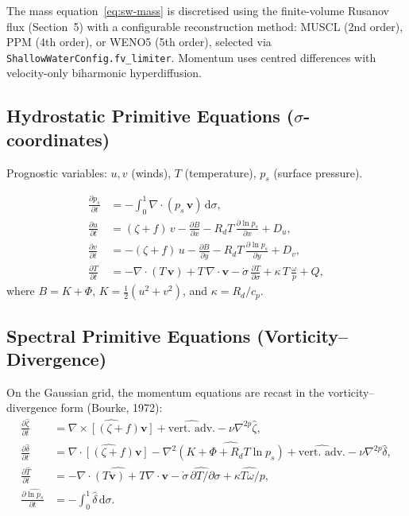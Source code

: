 \documentclass[11pt,a4paper]{article}
\newcommand{\dd}{\mathrm{d}}
\newcommand{\pp}{\partial}
\newcommand{\half}{\tfrac{1}{2}}
\newcommand{\Rd}{R_d}
\newcommand{\cpd}{c_p}
\begin{document}
The mass equation~\eqref{eq:sw-mass} is discretised using the finite-volume Rusanov flux (Section~5) with a configurable reconstruction method: MUSCL (2nd order), PPM (4th order), or WENO5 (5th order), selected via \texttt{ShallowWaterConfig.fv\_limiter}.  Momentum uses centred differences with velocity-only biharmonic hyperdiffusion.

\subsection{Hydrostatic Primitive Equations ($\sigma$-coordinates)}

Prognostic variables: $u,v$ (winds), $T$ (temperature), $p_s$ (surface pressure).

\begin{align}
  \frac{\pp p_s}{\pp t} &= -\int_0^1 \nabla\!\cdot\!(p_s\,\bm v)\,\dd\sigma, \label{eq:pe-ps}\\
  \frac{\pp u}{\pp t} &= (\zeta+f)\,v - \frac{\pp B}{\pp x} - \Rd T\,\frac{\pp\ln p_s}{\pp x} + D_u, \label{eq:pe-u}\\
  \frac{\pp v}{\pp t} &= -(\zeta+f)\,u - \frac{\pp B}{\pp y} - \Rd T\,\frac{\pp\ln p_s}{\pp y} + D_v, \label{eq:pe-v}\\
  \frac{\pp T}{\pp t} &= -\nabla\!\cdot\!(T\,\bm v)+T\,\nabla\!\cdot\!\bm v - \dot\sigma\,\frac{\pp T}{\pp\sigma} + \kappa\,T\,\frac{\omega}{p} + Q, \label{eq:pe-T}
\end{align}
where $B=K+\Phi$, $K=\half(u^2+v^2)$, and $\kappa=\Rd/\cpd$.

\subsection{Spectral Primitive Equations (Vorticity--Divergence)}

On the Gaussian grid, the momentum equations are recast in the vorticity--divergence form (Bourke, 1972):
\begin{align}
  \frac{\pp\hat\zeta}{\pp t} &= \widehat{\nabla\!\times\![(\zeta+f)\bm v]} + \widehat{\text{vert.\ adv.}} - \nu\nabla^{2p}\hat\zeta, \label{eq:spe-vor}\\
  \frac{\pp\hat\delta}{\pp t} &= \widehat{\nabla\!\cdot\![(\zeta+f)\bm v]} - \nabla^2\widehat{(K+\Phi+\Rd T\ln p_s)} + \widehat{\text{vert.\ adv.}} - \nu\nabla^{2p}\hat\delta, \label{eq:spe-div}\\
  \frac{\pp\hat T}{\pp t} &= \widehat{-\nabla\!\cdot\!(T\bm v)+T\nabla\!\cdot\!\bm v} - \widehat{\dot\sigma\,\pp T/\pp\sigma} + \widehat{\kappa T\omega/p}, \label{eq:spe-T}\\
  \frac{\pp\widehat{\ln p_s}}{\pp t} &= -\int_0^1\hat\delta\,\dd\sigma. \label{eq:spe-lnps}
\end{align}
\end{document}
